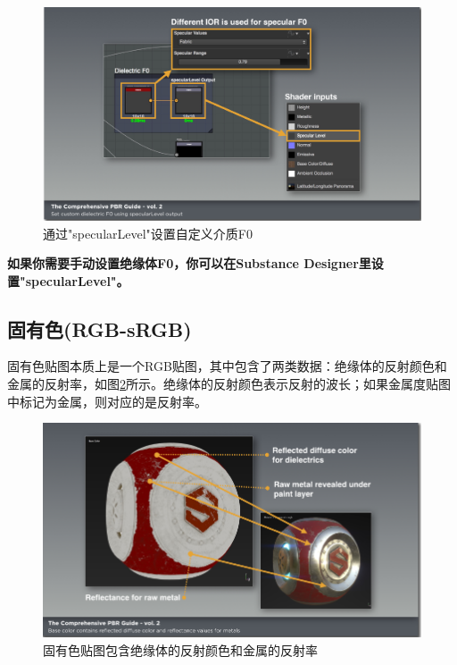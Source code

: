 \begin{figure}[ht]
    \centering
	\includegraphics[width=\textwidth]{images/chap2_6.png}
	\caption{通过"specularLevel"设置自定义介质F0}
    \label{fig:chap2_6}
\end{figure}

\textbf{如果你需要手动设置绝缘体F0，你可以在Substance Designer里设置"specularLevel"。}

\subsection{固有色(RGB-sRGB)}

固有色贴图本质上是一个RGB贴图，其中包含了两类数据：绝缘体的反射颜色和金属的反射率，如图\ref{fig:chap2_7}所示。绝缘体的反射颜色表示反射的波长；如果金属度贴图中标记为金属，则对应的是反射率。

\begin{figure}[ht]
    \centering
	\includegraphics[width=\textwidth]{images/chap2_7.png}
	\caption{固有色贴图包含绝缘体的反射颜色和金属的反射率}
    \label{fig:chap2_7}
\end{figure}

